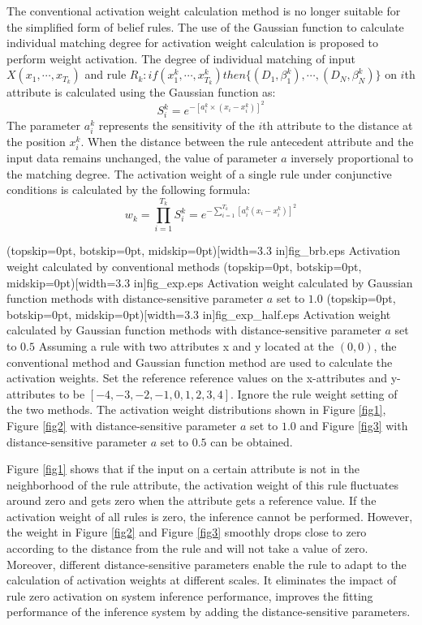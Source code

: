 \documentclass{ieeeaccess}
\begin{document}
The conventional activation weight calculation method is no longer suitable for the simplified form of belief rules.
The use of the Gaussian function to calculate individual matching degree for activation weight calculation is proposed to perform weight activation.
The degree of individual matching of input $X(x_1,\cdots,x_{T_k})$ and rule $R_k:if(x_1^k , \cdots , x_{T_k}^k)then\{(D_1,\beta_1^k),\cdots,(D_N,\beta_N^k)\}$ on $i$th attribute is calculated using the Gaussian function as:
\begin{equation}
    S_i^k=e^{-[a_i^k\times(x_i-x_i^k)]^2}
\end{equation}
The parameter $a_i^k$ represents the sensitivity of the $i$th attribute to the distance at the position $x_i^k$. When the distance between the rule antecedent attribute and the input data remains unchanged,
the value of parameter $a$ inversely proportional to the matching degree.
The activation weight of a single rule under conjunctive conditions is calculated by the following formula:
\begin{equation}
    w_k=\prod_{i=1}^{T_k}S_i^k=e^{-\sum_{i=1}^{T_k}[a_i^k(x_i-x_i^k)]^2}
\end{equation}


\Figure[!t](topskip=0pt, botskip=0pt, midskip=0pt)[width=3.3 in]{fig_brb.eps}
{Activation weight calculated by conventional methods\label{fig1}}
\Figure[!t](topskip=0pt, botskip=0pt, midskip=0pt)[width=3.3 in]{fig_exp.eps}
{Activation weight calculated by Gaussian function methods with distance-sensitive parameter $a$ set to $1.0$\label{fig2}}
\Figure[!t](topskip=0pt, botskip=0pt, midskip=0pt)[width=3.3 in]{fig_exp_half.eps}
{Activation weight calculated by Gaussian function methods with distance-sensitive parameter $a$ set to $0.5$\label{fig3}}
Assuming a rule with two attributes x and y located at the $(0,0)$, the conventional method and Gaussian function method are used to calculate the activation weights.
Set the reference reference values on the x-attributes and y-attributes to be $[-4,-3,-2,-1,0,1,2,3,4]$.
Ignore the rule weight setting of the two methods.
The activation weight distributions shown in Figure \ref{fig1},
Figure \ref{fig2} with distance-sensitive parameter $a$ set to $1.0$ and
Figure \ref{fig3} with distance-sensitive parameter $a$ set to $0.5$ can be obtained.

Figure \ref{fig1} shows that if the input on a certain attribute is not in the neighborhood of the rule attribute,
the activation weight of this rule fluctuates around zero and gets zero when the attribute gets a reference value.
If the activation weight of all rules is zero, the inference cannot be performed.
However, the weight in Figure \ref{fig2} and Figure \ref{fig3} smoothly drops close to zero according to the distance from the rule and will not take a value of zero.
Moreover, different distance-sensitive parameters enable the rule to adapt to the calculation of activation weights at different scales.
It eliminates the impact of rule zero activation on system inference performance,
improves the fitting performance of the inference system by adding the distance-sensitive parameters.
\end{document}
